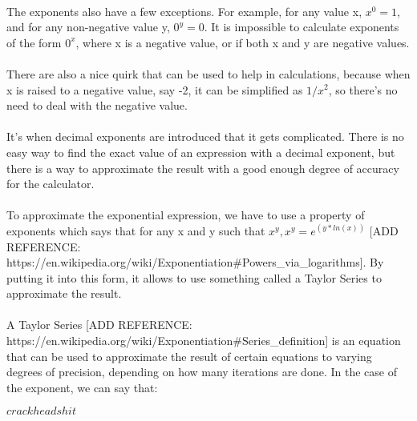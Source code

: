 \begin{itemize}
            \paragraph{}
            The exponents also have a few exceptions. For example, for any value x, $x^0=1$, and for any non-negative value y, $0^y=0$. It is impossible to calculate exponents of the form $0^x$, where x is a negative value, or if both x and y are negative values.

            \paragraph{}
            There are also a nice quirk that can be used to help in calculations, because when x is raised to a negative value, say -2, it can be simplified as $1/x^2$, so there’s no need to deal with the negative value.

            \paragraph{}
            It’s when decimal exponents are introduced that it gets complicated. There is no easy way to find the exact value of an expression with a decimal exponent, but there is a way to approximate the result with a good enough degree of accuracy for the calculator.

            \paragraph{}
            To approximate the exponential expression, we have to use a property of exponents which says that for any x and y such that $x^y, x^y = e^(y * ln(x))$ [ADD REFERENCE: https://en.wikipedia.org/wiki/Exponentiation#Powers_via_logarithms]. By putting it into this form, it allows to use something called a Taylor Series to approximate the result.

            \paragraph{}
            A Taylor Series [ADD REFERENCE: https://en.wikipedia.org/wiki/Exponentiation#Series_definition] is an equation that can be used to approximate the result of certain equations to varying degrees of precision, depending on how many iterations are done. In the case of the exponent, we can say that:

            \begin{center}
                $crackheadshit$
            \end{center}


\end{itemize}
